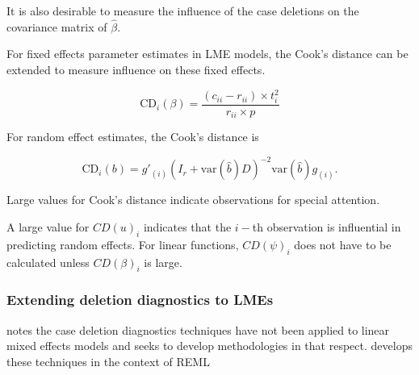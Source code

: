 \documentclass[12pt, a4paper]{report}
\theoremstyle{plain}
\theoremstyle{definition}
\theoremstyle{remark}
\begin{document}
	
	
	It is also desirable to measure the influence of the case deletions on the covariance matrix of $\hat{\beta}$.
	
	For fixed effects parameter estimates in LME models, the  Cook's distance can be extended to measure influence on these fixed effects.
	
	\[
	\mbox{CD}_{i}(\beta) = \frac{(c_{ii} - r_{ii}) \times t^2_{i}}{r_{ii} \times p}
	\]

	
	For random effect estimates, the  Cook's distance is
	
	\[
	\mbox{CD}_{i}(b) = g{\prime}_{(i)} (I_{r} + \mbox{var}(\hat{b})D)^{-2}\mbox{var}(\hat{b})g_{(i)}.
	\]
	
	Large values for Cook's distance indicate observations for special attention.
	
	A large value for $CD(u)_i$ indicates that the $i-$th observation is influential in predicting random effects.
	For linear functions, $CD(\psi)_i$ does not have to be calculated unless $CD(\beta)_i$ is large.

	
	
\subsubsection{Extending deletion diagnostics to LMEs}
	
	
	\citet{Christensen} notes the case deletion diagnostics techniques have not been applied to linear mixed effects models and seeks to develop methodologies in that respect. \citet{Christensen} develops these techniques in the context of REML
	
	
\end{document}
